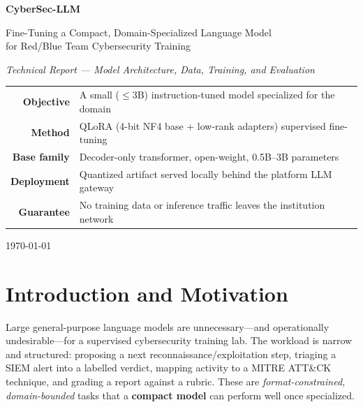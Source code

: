 \documentclass[11pt,a4paper]{article}
\begin{document}
\begin{titlepage}
\centering
\vspace*{1.5cm}
{\Huge\bfseries\color{vreddeep} CyberSec-LLM\par}
\vspace{0.4cm}
{\Large Fine-Tuning a Compact, Domain-Specialized Language Model\\ for Red/Blue Team Cybersecurity Training\par}
\vspace{0.3cm}
{\large\itshape Technical Report --- Model Architecture, Data, Training, and Evaluation\par}
\vspace{1.6cm}


\vspace{1.4cm}
\begin{tabular}{rl}
\textbf{Objective} & A small ($\leq$3B) instruction-tuned model specialized for the domain\\
\textbf{Method} & QLoRA (4-bit NF4 base + low-rank adapters) supervised fine-tuning\\
\textbf{Base family} & Decoder-only transformer, open-weight, 0.5B--3B parameters\\
\textbf{Deployment} & Quantized artifact served locally behind the platform LLM gateway\\
\textbf{Guarantee} & No training data or inference traffic leaves the institution network\\
\end{tabular}

\vfill
{\small \today\par}
\end{titlepage}

\tableofcontents
\newpage

\section{Introduction and Motivation}
Large general-purpose language models are unnecessary---and operationally
undesirable---for a supervised cybersecurity training lab. The workload is
narrow and structured: proposing a next reconnaissance/exploitation step,
triaging a SIEM alert into a labelled verdict, mapping activity to a MITRE
ATT\&CK technique, and grading a report against a rubric. These are
\emph{format-constrained, domain-bounded} tasks that a \textbf{compact
model} can perform well once specialized.
\end{document}
